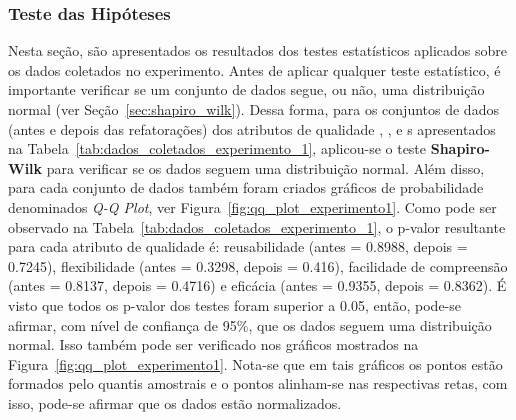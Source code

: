 \subsubsection{Teste das Hipóteses}

Nesta seção, são apresentados os resultados dos testes estatísticos aplicados sobre os dados coletados no experimento. Antes de aplicar qualquer teste estatístico, é importante verificar se um conjunto de dados segue, ou não, uma distribuição normal (ver Seção~\ref{sec:shapiro_wilk}). Dessa forma, para os conjuntos de dados (antes e depois das refatorações) dos atributos de qualidade , ,  e s apresentados na Tabela~\ref{tab:dados_coletados_experimento_1}, aplicou-se o teste \textbf{Shapiro-Wilk} para verificar se os dados seguem uma distribuição normal. Além disso, para cada conjunto de dados também foram criados gráficos de probabilidade denominados \textit{Q-Q Plot}, ver Figura~\ref{fig:qq_plot_experimento1}. Como pode ser observado na Tabela~\ref{tab:dados_coletados_experimento_1}, o p-valor resultante para cada atributo de qualidade é: reusabilidade (antes = 0.8988, depois = 0.7245), flexibilidade (antes = 0.3298, depois = 0.416), facilidade de compreensão (antes = 0.8137, depois = 0.4716) e eficácia (antes = 0.9355, depois = 0.8362). É visto que todos os p-valor dos testes foram superior a 0.05, então, pode-se afirmar, com nível de confiança de 95\%, que os dados seguem uma distribuição normal. Isso também pode ser verificado nos gráficos mostrados na Figura~\ref{fig:qq_plot_experimento1}. Nota-se que em tais gráficos os pontos estão formados pelo quantis amostrais e o pontos alinham-se nas respectivas retas, com isso, pode-se afirmar que os dados estão normalizados.

